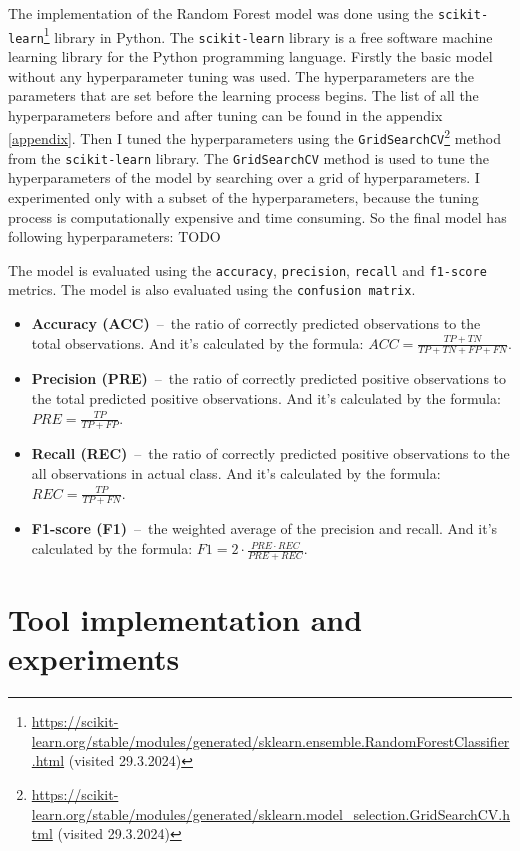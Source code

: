 The implementation of the Random Forest model was done using the \texttt{scikit-learn}\footnote[1]{\url{https://scikit-learn.org/stable/modules/generated/sklearn.ensemble.RandomForestClassifier.html} (visited 29.3.2024)} library in Python. 
The \texttt{scikit-learn} library is a free software machine learning library for the Python programming language.
Firstly the basic model without any hyperparameter tuning was used. The hyperparameters are the parameters that are set before the learning process begins.
The list of all the hyperparameters before and after tuning can be found in the appendix \ref{appendix}. 
Then I tuned the hyperparameters using the \texttt{GridSearchCV}\footnote{\url{https://scikit-learn.org/stable/modules/generated/sklearn.model_selection.GridSearchCV.html} (visited 29.3.2024)} method from the \texttt{scikit-learn} library. The \texttt{GridSearchCV} method is used to tune the hyperparameters of the model by searching over a grid of hyperparameters.
I experimented only with a subset of the hyperparameters, because the tuning process is computationally expensive and time consuming. 
So the final model has following hyperparameters: 
TODO

The model is evaluated using the \texttt{accuracy}, \texttt{precision}, \texttt{recall} and \texttt{f1-score} metrics. The model is also evaluated using the \texttt{confusion matrix}.
\begin{itemize}
    \item \textbf{Accuracy (ACC)}  \,--\, the ratio of correctly predicted observations to the total observations. And it's calculated by the formula: $ACC = \frac{TP + TN}{TP + TN + FP + FN}$.
    \item \textbf{Precision (PRE)} \,--\, the ratio of correctly predicted positive observations to the total predicted positive observations. And it's calculated by the formula: $PRE = \frac{TP}{TP + FP}$.
    \item \textbf{Recall (REC)} \,--\, the ratio of correctly predicted positive observations to the all observations in actual class. And it's calculated by the formula: $REC = \frac{TP}{TP + FN}$.
    \item \textbf{F1-score (F1)} \,--\, the weighted average of the precision and recall. And it's calculated by the formula: $F1 = 2 \cdot \frac{PRE \cdot REC}{PRE + REC}$.
\end{itemize}

\chapter{Tool implementation and experiments}

